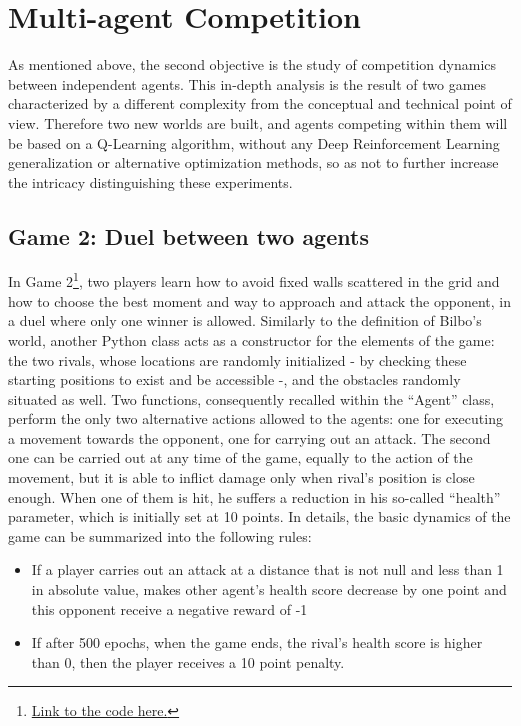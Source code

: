
\section{Multi-agent Competition}
As mentioned above, the second objective is the study of competition dynamics between independent agents. This in-depth analysis is the result of two games characterized by a different complexity from the conceptual and technical point of view. Therefore two new worlds are built, and agents competing within them will be based on a Q-Learning algorithm, without any Deep Reinforcement Learning generalization or alternative optimization methods, so as not to further increase the intricacy distinguishing these experiments.
\subsection{Game 2: Duel between two agents}
In Game 2\footnote{\href{https://github.com/moiraghif/DragonHunting/tree/master/Duel}{Link to the code here.}}, two players learn how to avoid fixed walls scattered in the grid and how to choose the best moment and way to approach and attack the opponent, in a duel where only one winner is allowed. Similarly to the definition of Bilbo's world, another Python class acts as a constructor for the elements of the game: the two rivals, whose locations are randomly initialized - by checking these starting positions to exist and be accessible -, and the obstacles randomly situated as well. Two functions, consequently recalled within the ``Agent'' class, perform the only two alternative actions allowed to the agents: one for executing a movement towards the opponent, one for carrying out an attack. The second one can be carried out at any time of the game, equally to the action of the movement, but it is able to inflict damage only when rival's position is close enough. When one of them is hit, he suffers a reduction in his so-called ``health'' parameter, which is initially set at 10 points. In details, the basic dynamics of the game can be summarized into the following rules:
\begin{itemize}[noitemsep, topsep=0ex]
  \item If a player carries out an attack at a distance that is not null and less than 1 in absolute value, makes other agent's health score decrease by one point and this opponent receive a negative reward of -1
  \item If after 500 epochs, when the game ends, the rival's health score is higher than 0, then the player receives a 10 point penalty.
\end{itemize}
